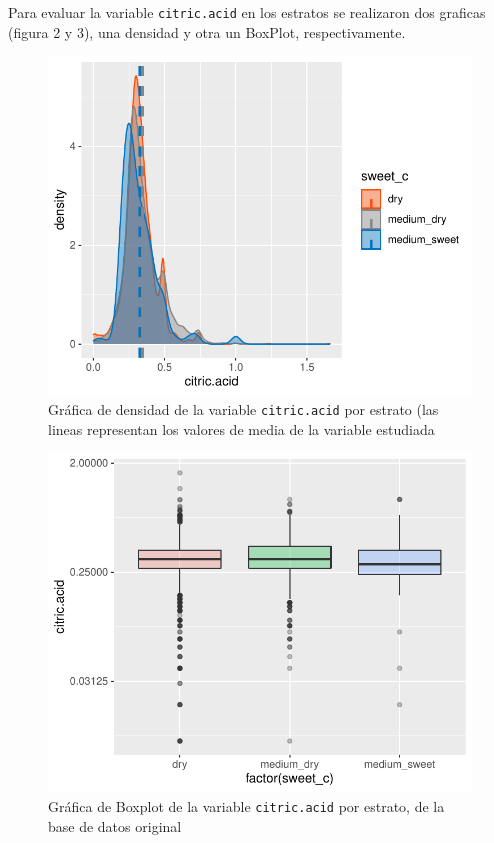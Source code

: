 \documentclass[
]{article}
\begin{document}
Para evaluar la variable \texttt{citric.acid} en los estratos se
realizaron dos graficas (figura 2 y 3), una densidad y otra un BoxPlot,
respectivamente.

\begin{figure}
\centering
\includegraphics{test_2_files/figure-latex/desity_plot untidy-1.pdf}
\caption{Gráfica de densidad de la variable \texttt{citric.acid} por
estrato (las lineas representan los valores de media de la variable
estudiada}
\end{figure}

\begin{figure}
\centering
\includegraphics{test_2_files/figure-latex/Boxplot untidy-1.pdf}
\caption{Gráfica de Boxplot de la variable \texttt{citric.acid} por
estrato, de la base de datos original}
\end{figure}
\end{document}
